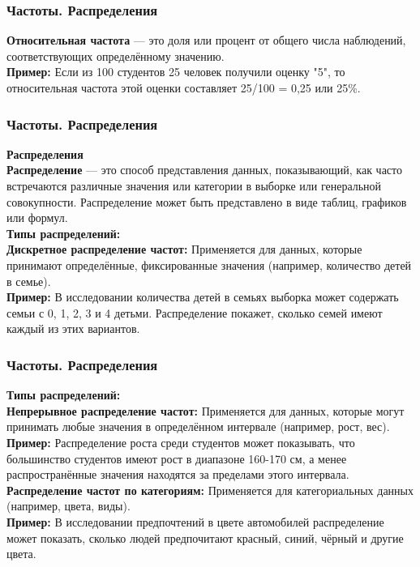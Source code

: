 \documentclass[aspectratio=169]{beamer}
\begin{document}
\begin{frame}
\frametitle{Частоты. Распределения}
\textbf{Относительная частота} — это доля или процент от общего числа наблюдений, соответствующих определённому значению.
\newline\\
\textbf{Пример:} Если из 100 студентов 25 человек получили оценку "5", то относительная частота этой оценки составляет 25/100 = 0,25 или 25\%.
\end{frame}

\begin{frame}
\frametitle{Частоты. Распределения}
\textbf{Распределения}
\newline\\
\textbf{Распределение} — это способ представления данных, показывающий, как часто встречаются различные значения или категории в выборке или генеральной совокупности. Распределение может быть представлено в виде таблиц, графиков или формул.
\newline\\
\textbf{Типы распределений:}
\newline\\
\textbf{Дискретное распределение частот:} Применяется для данных, которые принимают определённые, фиксированные значения (например, количество детей в семье).
\newline\\
\textbf{Пример:} В исследовании количества детей в семьях выборка может содержать семьи с 0, 1, 2, 3 и 4 детьми. Распределение покажет, сколько семей имеют каждый из этих вариантов.
\end{frame}

\begin{frame}
\frametitle{Частоты. Распределения}
\textbf{Типы распределений:}
\newline\\
\textbf{Непрерывное распределение частот:} Применяется для данных, которые могут принимать любые значения в определённом интервале (например, рост, вес).
\newline\\
\textbf{Пример:} Распределение роста среди студентов может показывать, что большинство студентов имеют рост в диапазоне 160-170 см, а менее распространённые значения находятся за пределами этого интервала.
\newline\\
\textbf{Распределение частот по категориям:} Применяется для категориальных данных (например, цвета, виды).
\newline\\
\textbf{Пример:} В исследовании предпочтений в цвете автомобилей распределение может показать, сколько людей предпочитают красный, синий, чёрный и другие цвета.
\end{frame}
\end{document}
